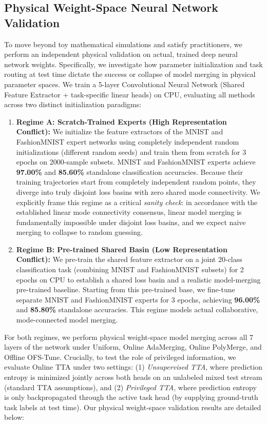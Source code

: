 \subsection{Physical Weight-Space Neural Network Validation}
\label{subsec:physical_validation}
To move beyond toy mathematical simulations and satisfy practitioners, we perform an independent physical validation on actual, trained deep neural network weights.
Specifically, we investigate how parameter initialization and task routing at test time dictate the success or collapse of model merging in physical parameter spaces.
We train a 5-layer Convolutional Neural Network (Shared Feature Extractor + task-specific linear heads) on CPU, evaluating all methods across two distinct initialization paradigms:

\begin{enumerate}
    \item \textbf{Regime A: Scratch-Trained Experts (High Representation Conflict):} We initialize the feature extractors of the MNIST and FashionMNIST expert networks using completely independent random initializations (different random seeds) and train them from scratch for 3 epochs on 2000-sample subsets.
MNIST and FashionMNIST experts achieve \textbf{97.00\%} and \textbf{85.60\%} standalone classification accuracies.
Because their training trajectories start from completely independent random points, they diverge into truly disjoint loss basins with zero shared mode connectivity.
We explicitly frame this regime as a critical \emph{sanity check}: in accordance with the established linear mode connectivity consensus, linear model merging is fundamentally impossible under disjoint loss basins, and we expect naive merging to collapse to random guessing.
    \item \textbf{Regime B: Pre-trained Shared Basin (Low Representation Conflict):} We pre-train the shared feature extractor on a joint 20-class classification task (combining MNIST and FashionMNIST subsets) for 2 epochs on CPU to establish a shared loss basin and a realistic model-merging pre-trained baseline.
Starting from this pre-trained base, we fine-tune separate MNIST and FashionMNIST experts for 3 epochs, achieving \textbf{96.00\%} and \textbf{85.80\%} standalone accuracies.
This regime models actual collaborative, mode-connected model merging.
\end{enumerate}

For both regimes, we perform physical weight-space model merging across all 7 layers of the network under Uniform, Online AdaMerging, Online PolyMerge, and Offline OFS-Tune.
Crucially, to test the role of privileged information, we evaluate Online TTA under two settings: (1) \emph{Unsupervised TTA}, where prediction entropy is minimized jointly across both heads on an unlabeled mixed test stream (standard TTA assumptions), and (2) \emph{Privileged TTA}, where prediction entropy is only backpropagated through the active task head (by supplying ground-truth task labels at test time).
Our physical weight-space validation results are detailed below:

